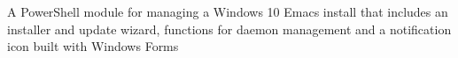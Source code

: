 \begin{project}

  \begin{projectdescription}
    A PowerShell module for managing a Windows 10 Emacs install that includes an
    installer and update wizard, functions for daemon management and a notification
    icon built with Windows Forms
  \end{projectdescription}
\end{project}
